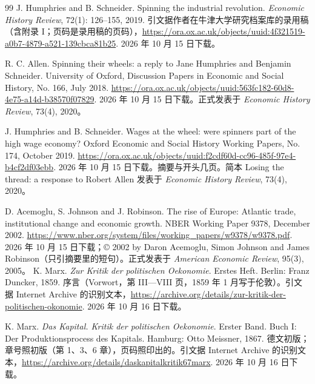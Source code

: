 \begin{thebibliography}{99}
 J. Humphries and B. Schneider. Spinning the industrial revolution. \emph{Economic History Review}, 72(1): 126--155, 2019. 引文据作者在牛津大学研究档案库的录用稿（含附录 I；页码是录用稿的页码），\url{https://ora.ox.ac.uk/objects/uuid:4f321519-a0b7-4879-a521-139cbca81b25}. 2026 年 10 月 15 日下载。

 R. C. Allen. Spinning their wheels: a reply to Jane Humphries and Benjamin Schneider. University of Oxford, Discussion Papers in Economic and Social History, No. 166, July 2018. \url{https://ora.ox.ac.uk/objects/uuid:563fc182-60d8-4e75-a14d-b38570f07829}. 2026 年 10 月 15 日下载。正式发表于 \emph{Economic History Review}, 73(4), 2020。

 J. Humphries and B. Schneider. Wages at the wheel: were spinners part of the high wage economy? Oxford Economic and Social History Working Papers, No. 174, October 2019. \url{https://ora.ox.ac.uk/objects/uuid:f2cdf60d-cc96-485f-97e4-b4cf2df03ebb}. 2026 年 10 月 15 日下载。摘要与开头几页。简本 Losing the thread: a response to Robert Allen 发表于 \emph{Economic History Review}, 73(4), 2020。

 D. Acemoglu, S. Johnson and J. Robinson. The rise of Europe: Atlantic trade, institutional change and economic growth. NBER Working Paper 9378, December 2002. \url{https://www.nber.org/system/files/working_papers/w9378/w9378.pdf}. 2026 年 10 月 15 日下载；© 2002 by Daron Acemoglu, Simon Johnson and James Robinson（只引摘要里的短句）。正式发表于 \emph{American Economic Review}, 95(3), 2005。
 K. Marx. \emph{Zur Kritik der politischen Oekonomie}. Erstes Heft. Berlin: Franz Duncker, 1859. 序言（Vorwort，第 III—VIII 页，1859 年 1 月写于伦敦）。引文据 Internet Archive 的识别文本，\url{https://archive.org/details/zur-kritik-der-politischen-okonomie}. 2026 年 10 月 16 日下载。

 K. Marx. \emph{Das Kapital. Kritik der politischen Oekonomie}. Erster Band. Buch I: Der Produktionsprocess des Kapitals. Hamburg: Otto Meissner, 1867. 德文初版；章号照初版（第 1、3、6 章），页码照印出的。引文据 Internet Archive 的识别文本，\url{https://archive.org/details/daskapitalkritik67marx}. 2026 年 10 月 16 日下载。


\end{thebibliography}
